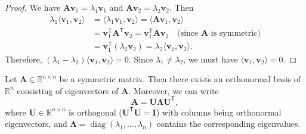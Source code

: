 \begin{proof}
  We have $\mathbf{A}\mathbf{v}_1 = \lambda_1 \mathbf{v}_1$ and $\mathbf{A}\mathbf{v}_2 = \lambda_2 \mathbf{v}_2$. Then
  \begin{align*}
    \lambda_1 \langle \mathbf{v}_1, \mathbf{v}_2 \rangle
     & = \langle \lambda_1 \mathbf{v}_1, \mathbf{v}_2 \rangle = \langle \mathbf{A}\mathbf{v}_1, \mathbf{v}_2 \rangle                                                       \\
     & = \mathbf{v}_1^{\mathsf{T}} \mathbf{A}^{\mathsf{T}} \mathbf{v}_2 = \mathbf{v}_1^{\mathsf{T}} \mathbf{A} \mathbf{v}_2 \quad \text{(since $\mathbf{A}$ is symmetric)} \\
     & = \mathbf{v}_1^{\mathsf{T}} (\lambda_2 \mathbf{v}_2) = \lambda_2 \langle \mathbf{v}_1, \mathbf{v}_2 \rangle.
  \end{align*}
  Therefore, $(\lambda_1 - \lambda_2) \langle \mathbf{v}_1, \mathbf{v}_2 \rangle = 0$.
  Since $\lambda_1 \neq \lambda_2$, we must have $\langle \mathbf{v}_1, \mathbf{v}_2 \rangle = 0$.
\end{proof}

\begin{theorem}\label{thm:spectral}
  Let $\mathbf{A} \in \mathbb{R}^{n \times n}$ be a symmetric matrix. Then there exists an orthonormal basis of $\mathbb{R}^n$
  consisting of eigenvectors of $\mathbf{A}$. Moreover, we can write
  \begin{equation}
    \mathbf{A} = \mathbf{U}\mathbf{\Lambda}\mathbf{U}^{\mathsf{T}},
  \end{equation}
  where $\mathbf{U} \in \mathbb{R}^{n \times n}$ is orthogonal ($\mathbf{U}^{\mathsf{T}}\mathbf{U} = \mathbf{I}$) with columns being orthonormal eigenvectors,
  and $\mathbf{\Lambda} = \operatorname{diag}(\lambda_1,\dots,\lambda_n)$ contains the corresponding eigenvalues.
\end{theorem}


